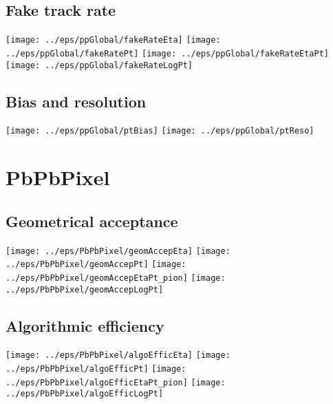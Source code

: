\documentclass[landscape]{article}
\begin{document}
\subsection{Fake track rate}
 \texttt{[image: ../eps/ppGlobal/fakeRateEta]}
 \texttt{[image: ../eps/ppGlobal/fakeRatePt]}
 \texttt{[image: ../eps/ppGlobal/fakeRateEtaPt]}
 \texttt{[image: ../eps/ppGlobal/fakeRateLogPt]}
 \newpage

\subsection{Bias and resolution}
 \texttt{[image: ../eps/ppGlobal/ptBias]}
 \texttt{[image: ../eps/ppGlobal/ptReso]}
 \newpage
\section{PbPbPixel}

\subsection{Geometrical acceptance}
 \texttt{[image: ../eps/PbPbPixel/geomAccepEta]}
 \texttt{[image: ../eps/PbPbPixel/geomAccepPt]}
 \texttt{[image: ../eps/PbPbPixel/geomAccepEtaPt\_pion]}
 \texttt{[image: ../eps/PbPbPixel/geomAccepLogPt]}
 \newpage
 
\subsection{Algorithmic efficiency}
 \texttt{[image: ../eps/PbPbPixel/algoEfficEta]}
 \texttt{[image: ../eps/PbPbPixel/algoEfficPt]}
 \texttt{[image: ../eps/PbPbPixel/algoEfficEtaPt\_pion]}
 \texttt{[image: ../eps/PbPbPixel/algoEfficLogPt]}
 \newpage
\end{document}
